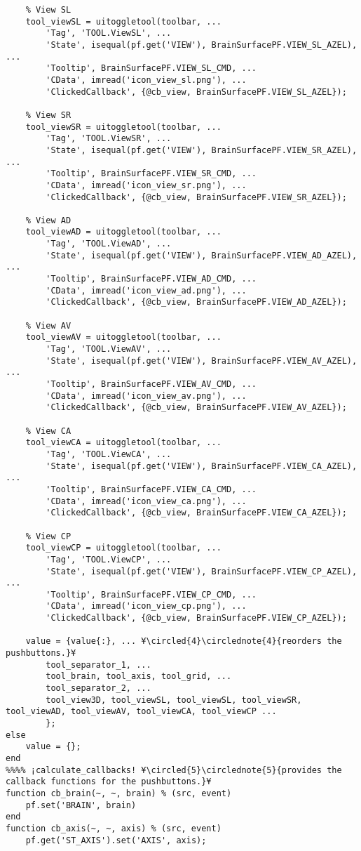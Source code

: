 \documentclass{tufte-handout}
\begin{document}
\begin{lstlisting}
    % View SL
    tool_viewSL = uitoggletool(toolbar, ...
        'Tag', 'TOOL.ViewSL', ...
        'State', isequal(pf.get('VIEW'), BrainSurfacePF.VIEW_SL_AZEL), ...
        'Tooltip', BrainSurfacePF.VIEW_SL_CMD, ...
        'CData', imread('icon_view_sl.png'), ...
        'ClickedCallback', {@cb_view, BrainSurfacePF.VIEW_SL_AZEL});

    % View SR
    tool_viewSR = uitoggletool(toolbar, ...
        'Tag', 'TOOL.ViewSR', ...
        'State', isequal(pf.get('VIEW'), BrainSurfacePF.VIEW_SR_AZEL), ...
        'Tooltip', BrainSurfacePF.VIEW_SR_CMD, ...
        'CData', imread('icon_view_sr.png'), ...
        'ClickedCallback', {@cb_view, BrainSurfacePF.VIEW_SR_AZEL});

    % View AD
    tool_viewAD = uitoggletool(toolbar, ...
        'Tag', 'TOOL.ViewAD', ...
        'State', isequal(pf.get('VIEW'), BrainSurfacePF.VIEW_AD_AZEL), ...
        'Tooltip', BrainSurfacePF.VIEW_AD_CMD, ...
        'CData', imread('icon_view_ad.png'), ...
        'ClickedCallback', {@cb_view, BrainSurfacePF.VIEW_AD_AZEL});

    % View AV
    tool_viewAV = uitoggletool(toolbar, ...
        'Tag', 'TOOL.ViewAV', ...
        'State', isequal(pf.get('VIEW'), BrainSurfacePF.VIEW_AV_AZEL), ...
        'Tooltip', BrainSurfacePF.VIEW_AV_CMD, ...
        'CData', imread('icon_view_av.png'), ...
        'ClickedCallback', {@cb_view, BrainSurfacePF.VIEW_AV_AZEL});

    % View CA
    tool_viewCA = uitoggletool(toolbar, ...
        'Tag', 'TOOL.ViewCA', ...
        'State', isequal(pf.get('VIEW'), BrainSurfacePF.VIEW_CA_AZEL), ...
        'Tooltip', BrainSurfacePF.VIEW_CA_CMD, ...
        'CData', imread('icon_view_ca.png'), ...
        'ClickedCallback', {@cb_view, BrainSurfacePF.VIEW_CA_AZEL});

    % View CP
    tool_viewCP = uitoggletool(toolbar, ...
        'Tag', 'TOOL.ViewCP', ...
        'State', isequal(pf.get('VIEW'), BrainSurfacePF.VIEW_CP_AZEL), ...
        'Tooltip', BrainSurfacePF.VIEW_CP_CMD, ...
        'CData', imread('icon_view_cp.png'), ...
        'ClickedCallback', {@cb_view, BrainSurfacePF.VIEW_CP_AZEL});
    
    value = {value{:}, ... ¥\circled{4}\circlednote{4}{reorders the pushbuttons.}¥
        tool_separator_1, ...
        tool_brain, tool_axis, tool_grid, ...
        tool_separator_2, ...
        tool_view3D, tool_viewSL, tool_viewSL, tool_viewSR, tool_viewAD, tool_viewAV, tool_viewCA, tool_viewCP ...
        };
else
    value = {};
end
%%%% ¡calculate_callbacks! ¥\circled{5}\circlednote{5}{provides the callback functions for the pushbuttons.}¥
function cb_brain(~, ~, brain) % (src, event)
    pf.set('BRAIN', brain)
end
function cb_axis(~, ~, axis) % (src, event)
    pf.get('ST_AXIS').set('AXIS', axis);
    

\end{lstlisting}
\end{document}
